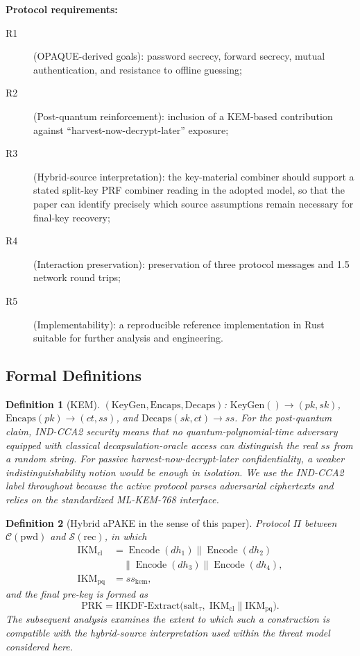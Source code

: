 \documentclass{ieeeijc}
\newtheorem{definition}{Definition}[section]
\theoremstyle{remark}
\begin{document}
\textbf{Protocol requirements:}
\begin{description}
  \item[R1] (OPAQUE-derived goals): password secrecy, forward secrecy,
        mutual authentication, and resistance to offline guessing;
  \item[R2] (Post-quantum reinforcement): inclusion of a KEM-based
        contribution against ``harvest-now-decrypt-later'' exposure;
  \item[R3] (Hybrid-source interpretation): the key-material combiner
        should support a stated split-key PRF combiner reading in the adopted
        model, so that the paper can identify precisely which source
        assumptions remain necessary for final-key recovery;
  \item[R4] (Interaction preservation): preservation of three protocol
        messages and 1.5 network round trips;
  \item[R5] (Implementability): a reproducible reference implementation
        in Rust suitable for further analysis and engineering.
\end{description}

\subsection{Formal Definitions}

\begin{definition}[KEM]
$(\mathrm{KeyGen}, \mathrm{Encaps}, \mathrm{Decaps})$:
$\mathrm{KeyGen}() \to (pk, sk)$,
$\mathrm{Encaps}(pk) \to (ct, ss)$, and
$\mathrm{Decaps}(sk, ct) \to ss$.
For the post-quantum claim, IND-CCA2 security means that no
quantum-polynomial-time adversary equipped with classical decapsulation-oracle
access can distinguish the real $ss$ from a random string.
For passive harvest-now-decrypt-later confidentiality, a weaker
indistinguishability notion would be enough in isolation. We use the
IND-CCA2 label throughout because the active protocol parses adversarial
ciphertexts and relies on the standardized ML-KEM-768 interface.
\end{definition}

\begin{definition}[Hybrid aPAKE in the sense of this paper]
Protocol $\Pi$ between $\mathcal{C}(\mathrm{pwd})$ and
$\mathcal{S}(\mathrm{rec})$, in which
\[
  \begin{aligned}
    \mathrm{IKM}_{\mathrm{cl}}
      &= \operatorname{Encode}(dh_1) \| \operatorname{Encode}(dh_2)\\
      &\quad \| \operatorname{Encode}(dh_3) \|
        \operatorname{Encode}(dh_4),\\
    \mathrm{IKM}_{\mathrm{pq}} &= ss_{\mathrm{kem}},
  \end{aligned}
\]
and the final pre-key is formed as
\[
  \mathrm{PRK} = \mathrm{HKDF\text{-}Extract}\!\bigl(
    \mathrm{salt}_{\tau},\;
    \mathrm{IKM}_{\mathrm{cl}} \| \mathrm{IKM}_{\mathrm{pq}}\bigr).
\]
The subsequent analysis examines the extent to which such a
construction is compatible with the hybrid-source interpretation used
within the threat model considered here.
\end{definition}
\end{document}
